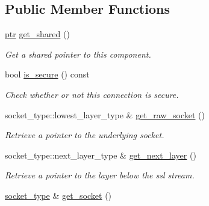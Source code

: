 \subsection*{Public Member Functions}
\begin{DoxyCompactItemize}
\item 
\hyperlink{classwebsocketpp_1_1transport_1_1asio_1_1tls__socket_1_1connection_a2aa605c27a476eba644e062dc5bc4f6d}{ptr} \hyperlink{classwebsocketpp_1_1transport_1_1asio_1_1tls__socket_1_1connection_ab03c718432a6b2020e8315d137930945}{get\+\_\+shared} ()\hypertarget{classwebsocketpp_1_1transport_1_1asio_1_1tls__socket_1_1connection_ab03c718432a6b2020e8315d137930945}{}\label{classwebsocketpp_1_1transport_1_1asio_1_1tls__socket_1_1connection_ab03c718432a6b2020e8315d137930945}

\begin{DoxyCompactList}\small\item\em Get a shared pointer to this component. \end{DoxyCompactList}\item 
bool \hyperlink{classwebsocketpp_1_1transport_1_1asio_1_1tls__socket_1_1connection_a0fd08b2eb100016f0f534aacf6caa8e3}{is\+\_\+secure} () const
\begin{DoxyCompactList}\small\item\em Check whether or not this connection is secure. \end{DoxyCompactList}\item 
socket\+\_\+type\+::lowest\+\_\+layer\+\_\+type \& \hyperlink{classwebsocketpp_1_1transport_1_1asio_1_1tls__socket_1_1connection_af8863f2d811106240b9ef43f6868c918}{get\+\_\+raw\+\_\+socket} ()
\begin{DoxyCompactList}\small\item\em Retrieve a pointer to the underlying socket. \end{DoxyCompactList}\item 
socket\+\_\+type\+::next\+\_\+layer\+\_\+type \& \hyperlink{classwebsocketpp_1_1transport_1_1asio_1_1tls__socket_1_1connection_a5105586ade9ca6e016f308b0aebfcb3c}{get\+\_\+next\+\_\+layer} ()
\begin{DoxyCompactList}\small\item\em Retrieve a pointer to the layer below the ssl stream. \end{DoxyCompactList}\item 
\hyperlink{classwebsocketpp_1_1transport_1_1asio_1_1tls__socket_1_1connection_ae99cd7b29da2c13b29709c2b901b545d}{socket\+\_\+type} \& \hyperlink{classwebsocketpp_1_1transport_1_1asio_1_1tls__socket_1_1connection_af86b843634236dee59431078a23b3527}{get\+\_\+socket} ()

\end{DoxyCompactItemize}
